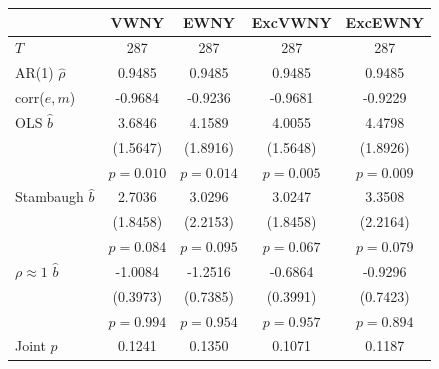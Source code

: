 \begin{tabular}{lcccc}
\toprule
 & VWNY & EWNY & ExcVWNY & ExcEWNY \\
\midrule
$T$ & 287 & 287 & 287 & 287 \\
AR(1) $\hat\rho$ & 0.9485 & 0.9485 & 0.9485 & 0.9485 \\
corr($e,m$) & -0.9684 & -0.9236 & -0.9681 & -0.9229 \\
\midrule
OLS $\hat b$ & 3.6846 & 4.1589 & 4.0055 & 4.4798 \\
 & (1.5647) & (1.8916) & (1.5648) & (1.8926) \\
 & $p=0.010$ & $p=0.014$ & $p=0.005$ & $p=0.009$ \\
Stambaugh $\hat b$ & 2.7036 & 3.0296 & 3.0247 & 3.3508 \\
 & (1.8458) & (2.2153) & (1.8458) & (2.2164) \\
 & $p=0.084$ & $p=0.095$ & $p=0.067$ & $p=0.079$ \\
$\rho\approx1$ $\hat b$ & -1.0084 & -1.2516 & -0.6864 & -0.9296 \\
 & (0.3973) & (0.7385) & (0.3991) & (0.7423) \\
 & $p=0.994$ & $p=0.954$ & $p=0.957$ & $p=0.894$ \\
\midrule
Joint $p$ & 0.1241 & 0.1350 & 0.1071 & 0.1187 \\
\bottomrule
\end{tabular}
